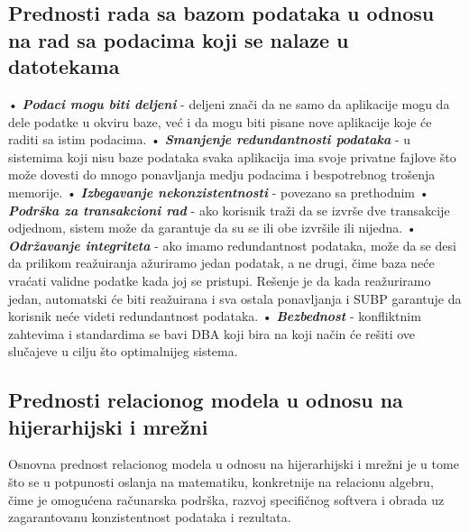 \documentclass{article}
\begin{document}
\subsection{Prednosti rada sa bazom podataka u odnosu na rad sa podacima
koji se nalaze u datotekama}
\hspace*{0.2cm}
• \textit{\textbf{Podaci mogu biti deljeni}} - deljeni znači da ne samo da
aplikacije mogu da dele podatke u okviru baze, već i da mogu biti pisane
nove aplikacije koje će raditi sa istim podacima.
\newline \hspace*{0.2cm}
• \textit{\textbf{Smanjenje redundantnosti podataka}} - u sistemima koji
nisu baze podataka svaka aplikacija ima svoje privatne fajlove što može
dovesti do mnogo ponavljanja medju podacima i bespotrebnog trošenja
memorije.
\newline \hspace*{0.2cm}
• \textbf{\textit{Izbegavanje nekonzistentnosti}} - povezano sa prethodnim
\newline \hspace*{0.2cm}
• \textit{\textbf{Podrška za transakcioni rad}} - ako korisnik traži da se
izvrše dve transakcije odjednom, sistem može da garantuje da su se ili obe
izvršile ili nijedna.
\newline \hspace*{0.2cm}
• \textit{\textbf{Održavanje integriteta}} - ako imamo redundantnost
podataka, može da se desi da prilikom reažuiranja ažuriramo jedan podatak,
a ne drugi, čime baza neće vraćati validne podatke kada joj se pristupi.
Rešenje je da kada reažuriramo jedan, automatski će biti reažuirana i sva
ostala ponavljanja i SUBP garantuje da korisnik neće videti redundantnost
podataka.
\newline \hspace*{0.2cm}
• \textit{\textbf{Bezbednost}} - konfliktnim zahtevima i standardima se 
bavi DBA koji bira na koji način će rešiti ove slučajeve u cilju što
optimalnijeg sistema.

\subsection{Prednosti relacionog modela u odnosu na hijerarhijski i mrežni}
Osnovna prednost relacionog modela u odnosu na hijerarhijski i mrežni je
u tome što se u potpunosti oslanja na matematiku, konkretnije na relacionu
algebru, čime je omogućena računarska podrška, razvoj specifičnog 
softvera i obrada uz zagarantovanu konzistentnost podataka i rezultata.
\end{document}
